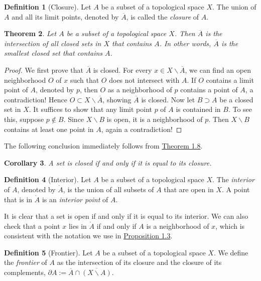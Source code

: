\documentclass{article}
\numberwithin{equation}{section}
\theoremstyle{plain}
\newtheorem{theorem}{Theorem}[section]
\newtheorem{corollary}[theorem]{Corollary}
\theoremstyle{definition}
\newtheorem{definition}[theorem]{Definition}
\begin{document}
\begin{definition}[Closure]\label{def：1.7}
Let $A$ be a subset of a topological space $X$. The union of $A$ and all its limit points, denoted by $\overline{A}$, is called the \textit{closure} of $A$.
\end{definition}

\begin{theorem}\label{thm:1.8}
Let $A$ be a subset of a topological space $X$. Then $\overline{A}$ is the intersection of all closed sets in $X$ that contains $A$. In other words, $\overline{A}$ is the smallest closed set that contains $A$.
\end{theorem}
\begin{proof}
We first prove that $\overline{A}$ is closed. For every $x\in X\backslash\overline{A}$, we can find an open neighborhood $O$ of $x$ such that $O$ does not intersect with $A$. If $O$ contains a limit point of $A$, denoted by $p$, then $O$ as a neighborhood of $p$ contains a point of $A$, a contradiction! Hence $O\subset X\backslash\overline{A}$, showing $\overline{A}$ is closed. Now let $B\supset A$ be a closed set in $X$. It suffices to show that any limit point $p$ of $A$ is contained in $B$. To see this, suppose $p\notin B$. Since $X\backslash B$ is open, it is a neighborhood of $p$. Then $X\backslash B$ contains at least one point in $A$, again a contradiction!
\end{proof}

The following conclusion immediately follows from \hyperref[thm:1.8]{Theorem 1.8}.
\begin{corollary}\label{cor:1.9}
A set is closed if and only if it is equal to its closure.
\end{corollary}

\begin{definition}[Interior]\label{def:1.10}
Let $A$ be a subset of a topological space $X$. The \textit{interior} of $A$, denoted by $\mathring{A}$, is the union of all subsets of $A$ that are open in $X$. A point that is in $\mathring{A}$ is an \textit{interior point} of $A$.
\end{definition}

It is clear that a set is open if and only if it is equal to its interior. We can also check that a point $x$ lies in $\mathring{A}$ if and only if $A$ is a neighborhood of $x$, which is consistent with the notation we use in \hyperref[prop:1.3]{Proposition 1.3}.

\begin{definition}[Frontier]\label{def:1.11} Let $A$ be a subset of a topological space $X$. We define the \textit{frontier} of $A$ as the intersection of its closure and the closure of its complements, $\partial A:= \overline{A}\cap\overline{(X\backslash A)}$.
\end{definition}
\end{document}
